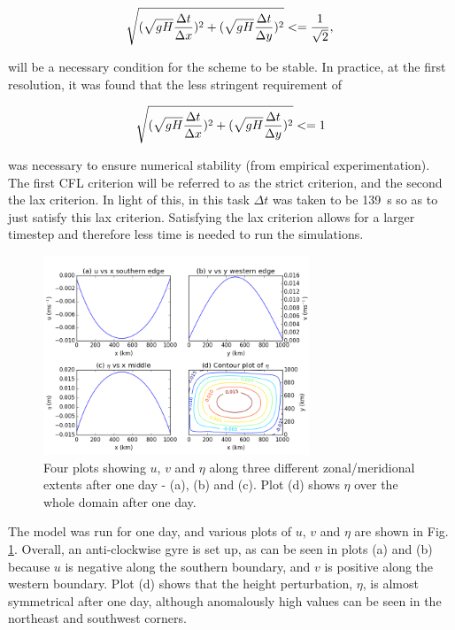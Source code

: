 \documentclass{article}
\begin{document}
\begin{equation}
    \label{eqn:cfl_strict} 
    \sqrt{(\sqrt{g H} \frac{\Delta t}{\Delta x})^2 + (\sqrt{g H} \frac{\Delta t}{\Delta y})^2} <=
    \frac{1}{\sqrt{2}},\\
\end{equation}

will be a necessary condition for the scheme to be stable. In practice, at the first resolution, it
was found that the less stringent requirement of

\begin{equation}
    \label{eqn:cfl_lax} 
    \sqrt{(\sqrt{g H} \frac{\Delta t}{\Delta x})^2 + (\sqrt{g H} \frac{\Delta t}{\Delta y})^2} <=
    1\\
\end{equation}

was necessary to ensure numerical stability (from empirical experimentation). The first CFL
criterion will be referred to as the strict criterion, and the second the lax criterion. In light of
this, in this task $\Delta t$ was taken to be \SI{139}{s} so as to just satisfy this lax criterion.
Satisfying the lax criterion allows for a larger timestep and therefore less time is needed to run
the simulations.

\begin{figure}[ht!]
    \centering
    \includegraphics[width=300px]{figures/task_a}
    \caption{Four plots showing $u$, $v$ and $\eta$ along three different zonal/meridional extents
	after one day - (a), (b) and (c). Plot (d) shows $\eta$ over the whole domain after one
    day.}
    \label{fig:task_a}
\end{figure}

The model was run for one day, and various plots of $u$, $v$ and $\eta$ are shown in Fig.
\ref{fig:task_a}. Overall, an anti-clockwise gyre is set up, as can be seen in plots (a) and (b)
because $u$ is negative along the southern boundary, and $v$ is positive along the western boundary.
Plot (d) shows that the height perturbation, $\eta$, is almost symmetrical after one day, although
anomalously high values can be seen in the northeast and southwest corners.
\end{document}
